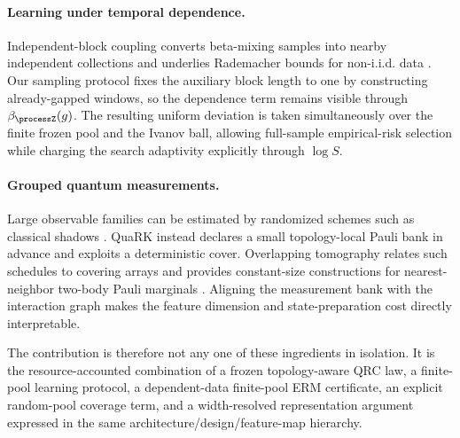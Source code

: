 \paragraph{Learning under temporal dependence.}
Independent-block coupling converts beta-mixing samples into nearby independent
collections and underlies Rademacher bounds for non-i.i.d. data
\citep{Yu1994,MohriRostamizadeh2008}.  Our sampling protocol fixes the
auxiliary block length to one by constructing already-gapped windows, so the
dependence term remains visible through $\beta_{\processZ}(g)$.  The resulting
uniform deviation is taken simultaneously over the finite frozen pool and the
Ivanov ball, allowing full-sample empirical-risk selection while charging the
search adaptivity explicitly through $\log S$.

\paragraph{Grouped quantum measurements.}
Large observable families can be estimated by randomized schemes such as
classical shadows \citep{HuangKuengPreskill2020}.  QuaRK instead declares a
small topology-local Pauli bank in advance and exploits a deterministic cover.
Overlapping tomography relates such schedules to covering arrays and provides
constant-size constructions for nearest-neighbor two-body Pauli marginals
\citep{HansenneEtAl2024}.  Aligning the measurement bank with the interaction
graph makes the feature dimension and state-preparation cost directly
interpretable.

The contribution is therefore not any one of these ingredients in isolation.
It is the resource-accounted combination of a frozen topology-aware QRC law,
a finite-pool learning protocol, a dependent-data finite-pool ERM certificate,
an explicit random-pool coverage term, and a width-resolved representation
argument expressed in the same
architecture/design/feature-map hierarchy.
